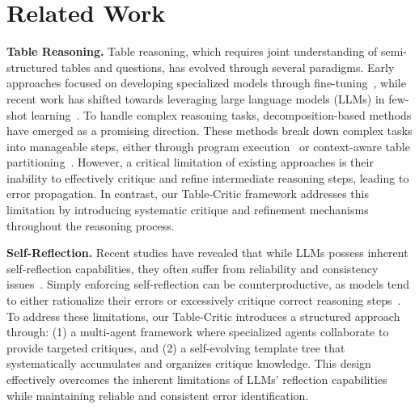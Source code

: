 \section{Related Work}
\textbf{Table Reasoning.}
Table reasoning, which requires joint understanding of semi-structured tables and questions, has evolved through several paradigms. Early approaches focused on developing specialized models through fine-tuning~\citep{yin2020tabert,liu2021tapex,gu2022pasta}, while recent work has shifted towards leveraging large language models (LLMs) in few-shot learning~\citep{chen2024tablerag,zhao2024tapera}. To handle complex reasoning tasks, decomposition-based methods have emerged as a promising direction. These methods break down complex tasks into manageable steps, either through program execution~\citep{cheng2022binding} or context-aware table partitioning~\citep{ye2023large,wang2024chain}. However, a critical limitation of existing approaches is their inability to effectively critique and refine intermediate reasoning steps, leading to error propagation.
In contrast, our Table-Critic framework addresses this limitation by introducing systematic critique and refinement mechanisms throughout the reasoning process.


\textbf{Self-Reflection.}
Recent studies have revealed that while LLMs possess inherent self-reflection capabilities, they often suffer from reliability and consistency issues~\citep{MadaanTGHGW0DPY23,abs-2412-19513}. Simply enforcing self-reflection can be counterproductive, as models tend to either rationalize their errors or excessively critique correct reasoning steps~\citep{critic-cot,chen2025learning}. To address these limitations, our Table-Critic introduces a structured approach through: (1) a multi-agent framework where specialized agents collaborate to provide targeted critiques, and (2) a self-evolving template tree that systematically accumulates and organizes critique knowledge. This design effectively overcomes the inherent limitations of LLMs' reflection capabilities while maintaining reliable and consistent error identification.


